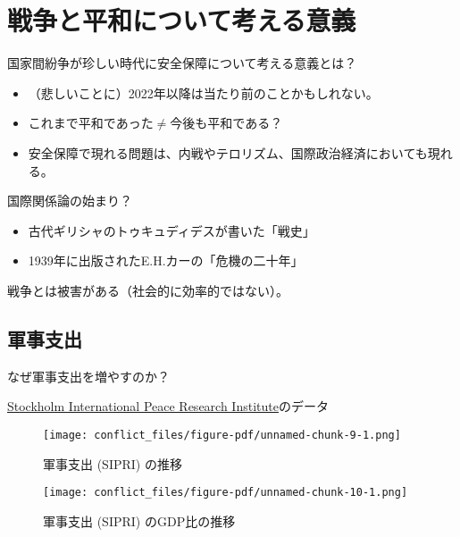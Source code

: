 \documentclass[
  xelatex,
  ja=standard]{bxjsarticle}
\providecommand{\tightlist}{%
  \setlength{\itemsep}{0pt}\setlength{\parskip}{0pt}}\usepackage{longtable,booktabs,array}
\begin{document}
\hypertarget{ux6226ux4e89ux3068ux5e73ux548cux306bux3064ux3044ux3066ux8003ux3048ux308bux610fux7fa9}{%
\section{戦争と平和について考える意義}\label{ux6226ux4e89ux3068ux5e73ux548cux306bux3064ux3044ux3066ux8003ux3048ux308bux610fux7fa9}}

国家間紛争が珍しい時代に安全保障について考える意義とは？

\begin{itemize}
\tightlist
\item
  （悲しいことに）2022年以降は当たり前のことかもしれない。
\item
  これまで平和であった\(\neq\)今後も平和である？
\item
  安全保障で現れる問題は、内戦やテロリズム、国際政治経済においても現れる。
\end{itemize}

国際関係論の始まり？

\begin{itemize}
\tightlist
\item
  古代ギリシャのトゥキュディデスが書いた「戦史」
\item
  1939年に出版されたE.H.カーの「危機の二十年」
\end{itemize}

戦争とは被害がある（社会的に効率的ではない）。

\hypertarget{ux8ecdux4e8bux652fux51fa}{%
\subsection{軍事支出}\label{ux8ecdux4e8bux652fux51fa}}

なぜ軍事支出を増やすのか？

\href{https://sipri.org/}{Stockholm International Peace Research
Institute}のデータ

\begin{figure}[htpb]

{\centering \texttt{[image: conflict\_files/figure-pdf/unnamed-chunk-9-1.png]}

}

\caption{軍事支出 (SIPRI) の推移}

\end{figure}

\begin{figure}[htpb]

{\centering \texttt{[image: conflict\_files/figure-pdf/unnamed-chunk-10-1.png]}

}

\caption{軍事支出 (SIPRI) のGDP比の推移}

\end{figure}
\end{document}
